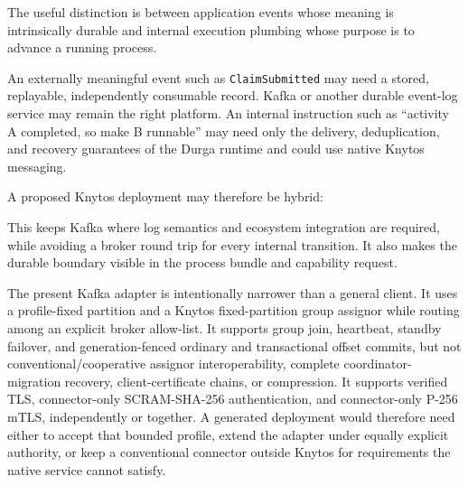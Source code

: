The useful distinction is between application events whose meaning is
intrinsically durable and internal execution plumbing whose purpose is to
advance a running process.

An externally meaningful event such as \texttt{ClaimSubmitted} may need a
stored, replayable, independently consumable record. Kafka or another durable
event-log service may remain the right platform. An internal instruction
such as ``activity A completed, so make B runnable'' may need only the delivery,
deduplication, and recovery guarantees of the Durga runtime and could use native
Knytos messaging.

A proposed Knytos deployment may therefore be hybrid:

\begin{center}
\end{center}

This keeps Kafka where log semantics and ecosystem integration are required,
while avoiding a broker round trip for every internal transition. It also makes
the durable boundary visible in the process bundle and capability request.

The present Kafka adapter is intentionally narrower than a general client. It
uses a profile-fixed partition and a Knytos fixed-partition group assignor
while routing among an explicit broker allow-list. It supports group join,
heartbeat, standby failover, and generation-fenced ordinary and transactional
offset commits, but not conventional/cooperative assignor interoperability,
complete coordinator-migration recovery, client-certificate chains, or
compression. It supports verified TLS,
connector-only SCRAM-SHA-256 authentication, and connector-only P-256 mTLS,
independently or together. A generated deployment
would therefore need either to accept that bounded profile, extend the adapter
under equally explicit authority, or keep a conventional connector outside
Knytos for requirements the native service cannot satisfy.

